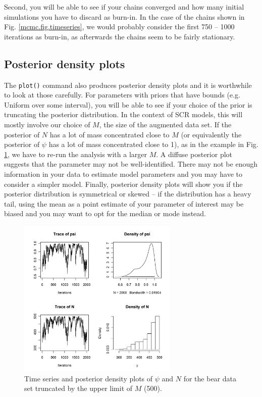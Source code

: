 Second, you will be able to see if your chains converged and how many initial simulations you have to discard as burn-in. In the case of the chains shown in Fig. \ref{mcmc.fig.timeseries}, we would probably consider the first 750 -- 1000 iterations as burn-in, as afterwards the chains seem to be fairly stationary.

\subsection{Posterior density plots}

The \verb#plot()# command also produces posterior density plots and it is worthwhile to look at those carefully. For parameters with priors that have bounds (e.g. Uniform over some interval), you will be able to see if your choice of the prior is truncating the posterior distribution. In the context of SCR models, this will mostly involve our choice of $M$, the size of the augmented data set. If the posterior of $N$ has a lot of mass concentrated close to $M$ (or equivalently the posterior of $\psi$ has a lot of mass concentrated close to 1), as in the example in Fig. \ref{mcmc.fig.timeseries2}, we have to re-run the analysis with a larger $M$.  A diffuse
posterior plot suggests
that the parameter may not be well-identified. 
There may not be enough information in your data to estimate model parameters and you may have to consider a simpler model. Finally, posterior density plots will show you if the posterior distribution is symmetrical or skewed -- if the distribution has a heavy tail, using the mean as a point estimate of your parameter of interest may be biased and you may want to opt for the median or mode instead.

\begin{figure}
\begin{center}
\includegraphics[height=3in]{Ch7/figs/timeseries2}
\end{center}
\caption{Time series and posterior density plots of $\psi$ and $N$ for the bear data set truncated by the upper limit of $M$ (500).}
\label{mcmc.fig.timeseries2}
\end{figure}

